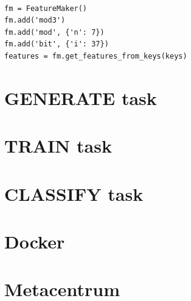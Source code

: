 \begin{verbatim}

fm = FeatureMaker()
fm.add('mod3')
fm.add('mod', {'n': 7})
fm.add('bit', {'i': 37})
features = fm.get_features_from_keys(keys)

\end{verbatim}

\section{GENERATE task}
\section{TRAIN task}
\section{CLASSIFY task}

\section{Docker}
\section{Metacentrum}